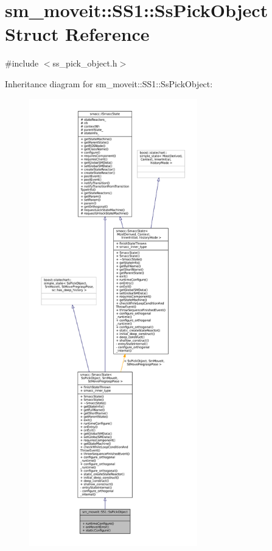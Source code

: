 \hypertarget{structsm__moveit_1_1SS1_1_1SsPickObject}{}\section{sm\+\_\+moveit\+:\+:S\+S1\+:\+:Ss\+Pick\+Object Struct Reference}
\label{structsm__moveit_1_1SS1_1_1SsPickObject}


{\ttfamily \#include $<$ss\+\_\+pick\+\_\+object.\+h$>$}



Inheritance diagram for sm\+\_\+moveit\+:\+:S\+S1\+:\+:Ss\+Pick\+Object\+:
\nopagebreak
\begin{figure}[H]
\begin{center}
\leavevmode
\includegraphics[height=550pt]{structsm__moveit_1_1SS1_1_1SsPickObject__inherit__graph}
\end{center}
\end{figure}


